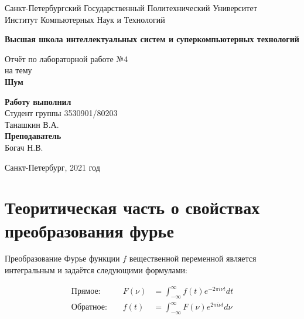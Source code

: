\documentclass[10pt,a4paper,oneside]{article}
\begin{document}
\begin{titlepage}
\newpage
	\begin{center}
		\Large Санкт-Петербургский Государственный Политехнический Университет\\
		Институт Компьютерных Наук и Технологий\\
	\end{center}
	\begin{center}
		\large\textbf {Высшая школа интеллектуальных систем и суперкомпьютерных технологий}
	\end{center}
	
	\vspace{5em}
	\begin{center}
		\large{Отчёт по лабораторной работе №4 \\ на тему \\
		\textbf{Шум} }
	\end{center}
	
	\vspace{25em}
	\begin{flushright}
		\textbf{Работу выполнил\\}Студент группы 3530901/80203 \\ Танашкин В.А.\\
		\textbf{Преподаватель\\}Богач Н.В. 
	\end{flushright}
	
	\vspace{\fill}%
	\begin{center}
	Санкт-Петербург, 2021 год	
	\end{center}
\end{titlepage} %

\section{Теоритическая часть о свойствах преобразования фурье}
Преобразование Фурье функции $f$ вещественной переменной является интегральным и задаётся следующими формулами: 
    
\[
    \begin{aligned}
        \text{Прямое: } && F(\nu) &= \int_{-\infty}^{\infty} f(t) e^{-2\pi i\nu t} dt \\
        \text{Обратное: } && f(t) &=  \int_{-\infty}^{\infty} F(\nu) e^{2\pi i\nu t} d\nu
    \end{aligned}
\]
\end{document}
